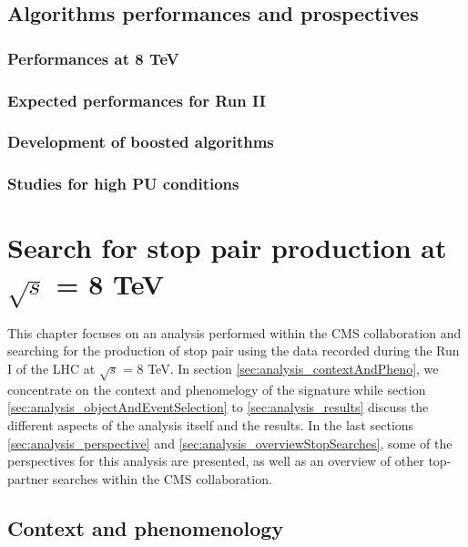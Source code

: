     \section{Algorithms performances and prospectives}
        \loremipsum
        \subsection{Performances at 8 TeV}
        \loremipsum
        \subsection{Expected performances for Run II}
        \loremipsum
        \subsection{Development of boosted algorithms}
        \loremipsum
        \subsection{Studies for high PU conditions}
        \loremipsum







\chapter{Search for stop pair production at $\sqrt{s}$ = 8 TeV}

    This chapter focuses on an analysis performed within the CMS collaboration 
    and searching for the production of stop pair using the data recorded during 
    the Run I of the LHC at $\sqrt{s}$ = 8 TeV. In section \ref{sec:analysis_contextAndPheno}, 
    we concentrate on the context and phenomelogy of the signature while section 
    \ref{sec:analysis_objectAndEventSelection} to \ref{sec:analysis_results} discuss 
    the different aspects of the analysis itself and the results. In the last sections 
    \ref{sec:analysis_perspective} and \ref{sec:analysis_overviewStopSearches}, some 
    of the perspectives for this analysis are presented, as well as an overview of 
    other top-partner searches within the CMS collaboration.

    \section{Context and phenomenology \label{sec:analysis_contextAndPheno}}

